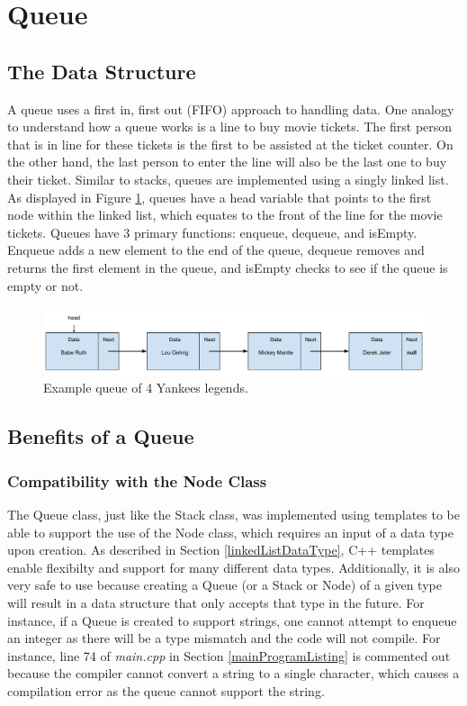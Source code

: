 \documentclass[letterpaper, 10pt,DIV=13]{scrartcl}
\numberwithin{equation}{section} %
\numberwithin{figure}{section} %
\numberwithin{table}{section} %
\begin{document}
\section{Queue}
\subsection{The Data Structure}
A queue uses a first in, first out (FIFO) approach to handling data. One analogy to understand how a queue works is a line to buy movie tickets. The first person that
is in line for these tickets is the first to be assisted at the ticket counter. On the other hand, the last person to enter the line will also be the last one to
buy their ticket. Similar to stacks, queues are implemented using a singly linked list. As displayed in Figure \ref{figure:queue}, queues have a head variable 
that points to the first node within the linked list, which equates to the front of the line for the movie tickets. Queues have 3 primary functions: enqueue, dequeue,
and isEmpty. Enqueue adds a new element to the end of the queue, dequeue removes and returns the first element in the queue, and isEmpty checks to see if the queue is empty or not.

\begin{figure}[ht] 
    \centering 
    \includegraphics[width=15cm]{queue}
    \caption{Example queue of 4 Yankees legends.}
    \label{figure:queue}
 \end{figure}

\subsection{Benefits of a Queue}
\subsubsection{Compatibility with the Node Class}\label{queueNodes}
The Queue class, just like the Stack class, was implemented using templates to be able to support the use of the Node class, which requires an input of a data type upon
creation. As described in Section \ref{linkedListDataType}, C++ templates enable flexibilty and support for many different data types. Additionally, it is also very
safe to use because creating a Queue (or a Stack or Node) of a given type will result in a data structure that only accepts that type in the future. For instance, if a Queue is created
to support strings, one cannot attempt to enqueue an integer as there will be a type mismatch and the code will not compile. For instance, line 74 of \textit{main.cpp}
in Section \ref{mainProgramListing} is commented out because the compiler cannot convert a string to a single character, which causes a compilation error as the queue
cannot support the string.
\end{document}
